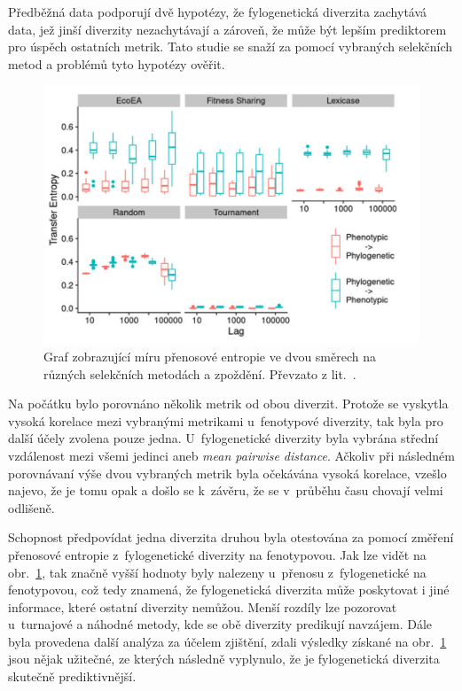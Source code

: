 Předběžná data podporují dvě hypotézy, že fylogenetická diverzita zachytává data, jež jinší diverzity nezachytávají a zároveň, že může být lepším prediktorem pro úspěch ostatních metrik. Tato studie se snaží za pomocí vybraných selekčních metod a problémů tyto hypotézy ověřit.

\begin{figure}[!h]
    \centering
    \includegraphics[scale=0.4]{obrazky-figures/diversities-entropies.png}
    \caption{Graf zobrazující míru přenosové entropie ve dvou směrech na různých selekčních metodách a zpoždění. Převzato z lit.~\cite[str. 77]{GPTPXVIII}.}
    \label{fig:diversities-entropies}
\end{figure}


Na počátku bylo porovnáno několik metrik od obou diverzit. Protože se vyskytla vysoká korelace mezi vybranými metrikami u~fenotypové diverzity, tak byla pro další účely zvolena pouze jedna. U~fylogenetické diverzity byla vybrána střední vzdálenost mezi všemi jedinci aneb \emph{mean pairwise distance}. Ačkoliv při následném porovnávaní výše dvou vybraných metrik byla očekávána vysoká korelace, vzešlo najevo, že je tomu opak a došlo se k~závěru, že se v~průběhu času chovají velmi odlišeně. 

Schopnost předpovídat jedna diverzita druhou byla otestována za pomocí změření přenosové entropie z~fylogenetické diverzity na fenotypovou. Jak lze  vidět na obr.~\ref{fig:diversities-entropies}, tak značně vyšší hodnoty byly nalezeny u~přenosu z~fylogenetické na fenotypovou, což tedy znamená, že fylogenetická diverzita může poskytovat i jiné informace, které ostatní diverzity nemůžou. Menší rozdíly lze pozorovat u~turnajové a náhodné metody, kde se obě diverzity predikují navzájem. Dále byla provedena další analýza za účelem zjištění, zdali výsledky získané na obr.~\ref{fig:diversities-entropies} jsou nějak užitečné, ze kterých následně vyplynulo, že je fylogenetická diverzita skutečně prediktivnější.

